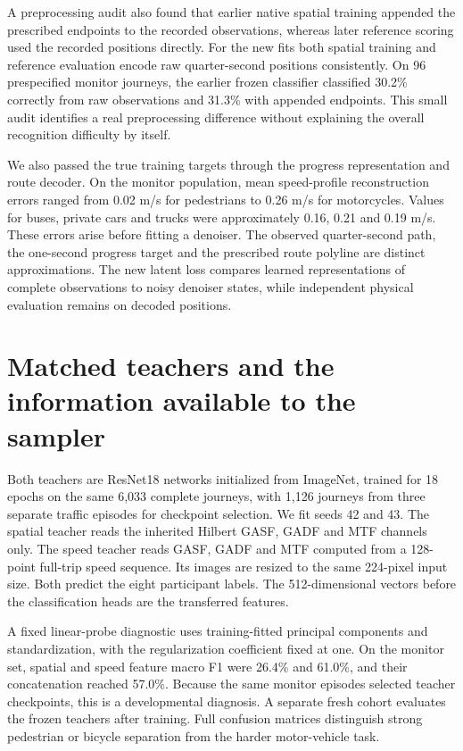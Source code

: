 A preprocessing audit also found that earlier native spatial training appended the prescribed endpoints to the recorded observations, whereas later reference scoring used the recorded positions directly. For the new fits both spatial training and reference evaluation encode raw quarter-second positions consistently. On 96 prespecified monitor journeys, the earlier frozen classifier classified 30.2\% correctly from raw observations and 31.3\% with appended endpoints. This small audit identifies a real preprocessing difference without explaining the overall recognition difficulty by itself.

We also passed the true training targets through the progress representation and route decoder. On the monitor population, mean speed-profile reconstruction errors ranged from 0.02 m/s for pedestrians to 0.26 m/s for motorcycles. Values for buses, private cars and trucks were approximately 0.16, 0.21 and 0.19 m/s. These errors arise before fitting a denoiser. The observed quarter-second path, the one-second progress target and the prescribed route polyline are distinct approximations. The new latent loss compares learned representations of complete observations to noisy denoiser states, while independent physical evaluation remains on decoded positions.

\section{Matched teachers and the information available to the sampler}
Both teachers are ResNet18 networks initialized from ImageNet, trained for 18 epochs on the same 6,033 complete journeys, with 1,126 journeys from three separate traffic episodes for checkpoint selection. We fit seeds 42 and 43. The spatial teacher reads the inherited Hilbert GASF, GADF and MTF channels only. The speed teacher reads GASF, GADF and MTF computed from a 128-point full-trip speed sequence. Its images are resized to the same 224-pixel input size. Both predict the eight participant labels. The 512-dimensional vectors before the classification heads are the transferred features.

A fixed linear-probe diagnostic uses training-fitted principal components and standardization, with the regularization coefficient fixed at one. On the monitor set, spatial and speed feature macro F1 were 26.4\% and 61.0\%, and their concatenation reached 57.0\%. Because the same monitor episodes selected teacher checkpoints, this is a developmental diagnosis. A separate fresh cohort evaluates the frozen teachers after training. Full confusion matrices distinguish strong pedestrian or bicycle separation from the harder motor-vehicle task.

